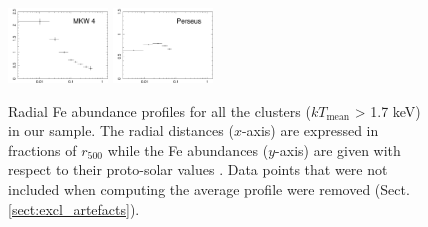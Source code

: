 \documentclass{aa}
\begin{document}
\begin{figure}[!]
                \includegraphics[width=0.236\textwidth,trim={0 0 0 0},clip]{fig_MKW4_Fe.pdf}
                \includegraphics[width=0.236\textwidth,trim={0 0 0 0},clip]{fig_Perseus_Fe.pdf}



        \caption{Radial Fe abundance profiles for all the clusters ($kT_\text{mean}$ > 1.7 keV) in our sample. The radial distances ($x$-axis) are expressed in fractions of $r_{500}$ while the Fe abundances ($y$-axis) are given with respect to their proto-solar values \citep{2009LanB...4B...44L}. Data points that were not included when computing the average profile were removed (Sect. \ref{sect:excl_artefacts}).}
\label{fig:Fe_profiles_indiv_clusters}
\end{figure}
\end{document}
